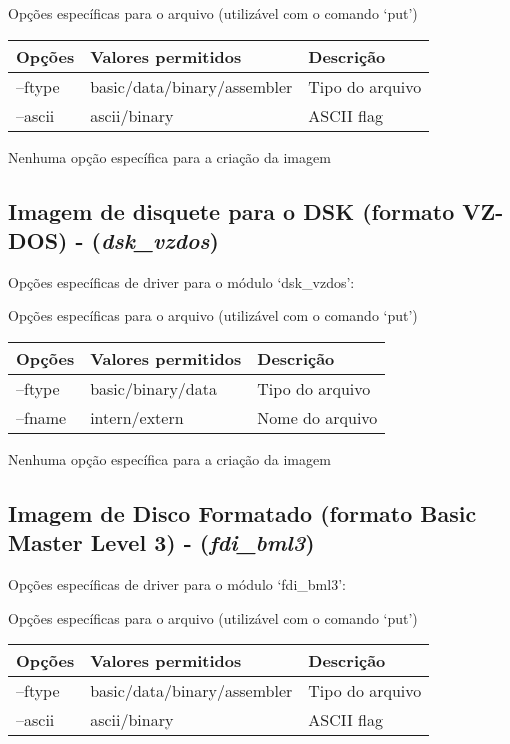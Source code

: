 \documentclass[letterpaper,10pt,brazil]{sphinxmanual}
\begin{document}
Opções específicas para o arquivo (utilizável com o comando `put')

\noindent\begin{tabulary}{\linewidth}{|L|L|L|}
\hline

Opções
&
Valores permitidos
&
Descrição
\\
\hline
--ftype
&
basic/data/binary/assembler
&
Tipo do arquivo
\\
\hline
--ascii
&
ascii/binary
&
ASCII flag
\\
\hline\end{tabulary}


Nenhuma opção específica para a criação da imagem


\subsection{Imagem de disquete para o DSK (formato VZ-DOS) - (\emph{dsk\_vzdos})}
\label{tools/imgtool:imagem-de-disquete-para-o-dsk-formato-vz-dos-dsk-vzdos}
Opções específicas de driver para o módulo `dsk\_vzdos':

Opções específicas para o arquivo (utilizável com o comando `put')

\noindent\begin{tabulary}{\linewidth}{|L|L|L|}
\hline

Opções
&
Valores permitidos
&
Descrição
\\
\hline
--ftype
&
basic/binary/data
&
Tipo do arquivo
\\
\hline
--fname
&
intern/extern
&
Nome do arquivo
\\
\hline\end{tabulary}


Nenhuma opção específica para a criação da imagem


\subsection{Imagem de Disco Formatado (formato Basic Master Level 3) - (\emph{fdi\_bml3})}
\label{tools/imgtool:imagem-de-disco-formatado-formato-basic-master-level-3-fdi-bml3}
Opções específicas de driver para o módulo `fdi\_bml3':

Opções específicas para o arquivo (utilizável com o comando `put')

\noindent\begin{tabulary}{\linewidth}{|L|L|L|}
\hline

Opções
&
Valores permitidos
&
Descrição
\\
\hline
--ftype
&
basic/data/binary/assembler
&
Tipo do arquivo
\\
\hline
--ascii
&
ascii/binary
&
ASCII flag
\\
\hline\end{tabulary}
\end{document}
